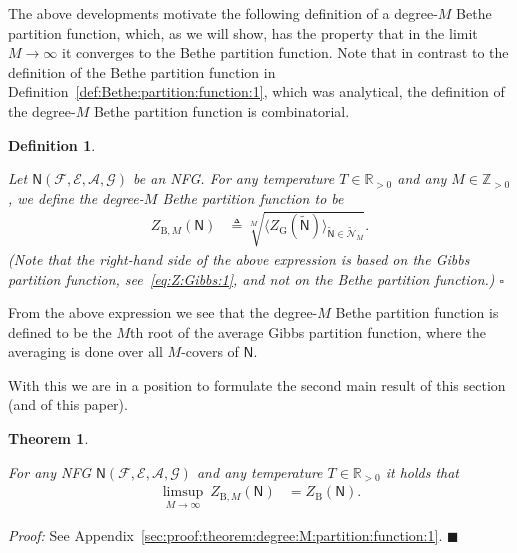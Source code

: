 \documentclass[journal, twocolumn]{IEEEtran}
\newcommand{\Rpp}{\mathbb{R}_{>0}}
\newcommand{\Z}{\mathbb{Z}}
\newcommand{\Zpp}{\Z_{>0}}
\newcommand{\set}[1]{\mathcal{#1}}
\newcommand{\graph}[1]{\mathsf{#1}}
\newcommand{\defeq}{\triangleq}
\newcommand{\setA}{\set{A}}
\newcommand{\setE}{\set{E}}
\newcommand{\setF}{\set{F}}
\newcommand{\setG}{\set{G}}
\newcommand{\graphN}{\graph{N}}
\newcommand{\ZBethe}{Z_{\mathrm{B}}}
\newcommand{\ZBetheM}[1]{Z_{\mathrm{B}, #1}}
\newcommand{\cover}[1]{\tilde{#1}}
\newcommand{\cset}[1]{\cover{\set{#1}}}
\newcommand{\cgraph}[1]{\cover{\graph{#1}}}
\newcommand{\?}{\mathrm{?}}
\newcommand{\qedblack}{\hspace*{\fill}%
  $\blacksquare$\smallskip}
\newcommand{\qedwhite}{\hspace*{\fill}%
  $\square$\smallskip}
\newcommand{\defend}{\qedwhite}
\newcommand{\ZGibbs}{Z_{\mathrm{G}}}
\newtheorem{Theorem}[Lemma]{Theorem}
\newtheorem{Definition}[Lemma]{Definition}
\newenvironment{Proof}%
  {\noindent \emph{Proof:}}{\qedblack}
\begin{document}
The above developments motivate the following definition of a degree-$M$ Bethe
partition function, which, as we will show, has the property that in the limit
$M \to \infty$ it converges to the Bethe partition function. Note that in
contrast to the definition of the Bethe partition function in
Definition~\ref{def:Bethe:partition:function:1}, which was analytical, the
definition of the degree-$M$ Bethe partition function is combinatorial.


\begin{Definition}
  \label{def:degree:M:partition:function:1}
 
  Let $\graphN(\setF,\setE, \setA, \setG)$ be an NFG. For any
  temperature $T \in \Rpp$ and any $M \in \Zpp$, we define the degree-$M$
  Bethe partition function to be
  \begin{align*}
    \ZBetheM{M}(\graphN)
      &\defeq
         \sqrt[M]{\Big\langle \!
                    \ZGibbs(\cgraph{N})
                  \! \Big\rangle_{\cgraph{N} \in \cset{N}_{M}}}.
  \end{align*}
  (Note that the right-hand side of the above expression is based on the Gibbs
  partition function, see~\eqref{eq:Z:Gibbs:1}, and not on the Bethe partition
  function.)  \defend
\end{Definition}


From the above expression we see that the degree-$M$ Bethe partition function
is defined to be the $M$th root of the average Gibbs partition function,
where the averaging is done over all $M$-covers of $\graphN$.


With this we are in a position to formulate the second main result of this
section (and of this paper).


\begin{Theorem}
  \label{theorem:degree:M:partition:function:1}
 
  For any NFG $\graphN(\setF,\setE, \setA, \setG)$ and any
  temperature $T \in \Rpp$ it holds that
  \begin{align*}
    \limsup_{M \to \infty} \ 
      \ZBetheM{M}(\graphN)
      &= \ZBethe(\graphN).
  \end{align*}
\end{Theorem}


\begin{Proof}
  See Appendix~\ref{sec:proof:theorem:degree:M:partition:function:1}.
\end{Proof}
\end{document}
